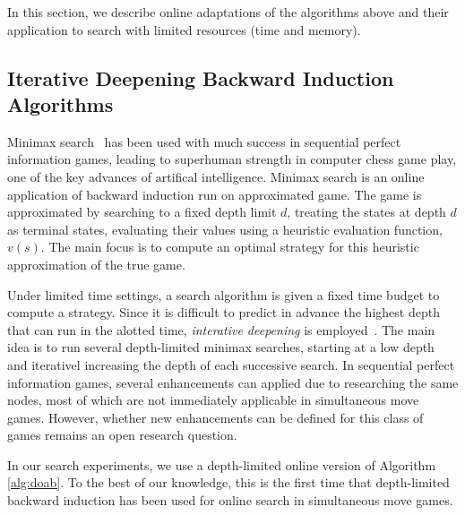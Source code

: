 
In this section, we describe online adaptations of the algorithms above and their application 
to search with limited resources (time and memory). 

\subsection{Iterative Deepening Backward Induction Algorithms} \label{sec:idbi}

Minimax search~\cite{AIbook} has been used with much success in sequential perfect information games, 
leading to superhuman strength in computer chess game play, one of the key advances of artifical 
intelligence. 
Minimax search is an online application of backward induction run on approximated game. 
The game is approximated by searching to a fixed depth limit $d$, treating the states at depth $d$
as terminal states, evaluating their values using a heuristic evaluation function, $v(s)$. 
The main focus is to compute an optimal strategy for this heuristic approximation of the true game. 

Under limited time settings, a search algorithm is given a fixed time budget to compute a strategy. 
Since it is difficult to predict in advance the highest depth that can run in the alotted time, 
{\it interative deepening} is employed~\cite{Marsland83}. The main idea is to run several depth-limited 
minimax searches, starting at a low depth and iterativel increasing the depth of each successive search. 
In sequential perfect information games, several enhancements can applied due to researching the same 
nodes, most of which are not immediately applicable in simultaneous move games. However, whether new 
enhancements can be defined for this class of games remains an open research question. 

In our search experiments, we use a depth-limited online version of Algorithm \ref{alg:doab}. To the 
best of our knowledge, this is the first time that depth-limited backward induction has been used for 
online search in simultaneous move games. 






